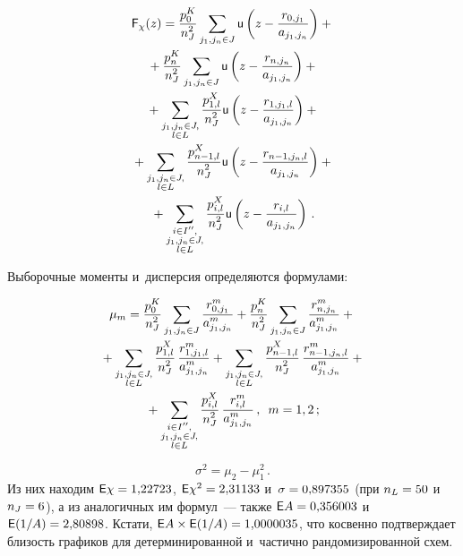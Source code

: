 \begin{multicols}{2}
  \noindent
  \begin{multline*}
  {\sf F}_\chi (z) =\fr{p_0^K}{n_J^2}\sum\limits_{j_1, j_n\in J} {\sf u}\left( z-
\fr{r_{0,j_1}}{a_{j_1,j_n}}\right) +{}\\
{}+\fr{p_n^K}{n_J^2} \sum\limits_{j_1, j_n\in J} 
{\sf u} \left( z- \fr{r_{n,j_n}}{a_{j_1,j_n}}\right) +{}\\
  {}+ \sum\limits_{\substack{{j_1, j_n\in J,}\\
  { l\in L}}} \fr{p^X_{1,l}}{n_J^2}{\sf u} \left( z-
\fr{r_{1,j_1,l}}{a_{j_1,j_n}}\right)+ {}\\
{}+
\sum\limits_{\substack{{j_1, j_n\in J,}\\
{ l\in L}}} \fr{p^X_{n-1, l}}{n_J^2} {\sf u} 
\left( z-\fr{r_{n-1, j_n,l}}{a_{j_1, j_n}}\right)+{}\\
  {}+ \sum\limits_{
  \substack{{i\in I^{\prime\prime},}\\
  {j_1, j_n\in J,}\\
  {l\in L}}} \fr{p^X_{i,l}}{n_J^2} 
{\sf u} \left( z-\fr{r_{i,l}}{a_{j_1,j_n}}\right)\,.
  \end{multline*}
  
  Выборочные моменты и~дисперсия определяются формулами:
  
  \noindent
  \begin{multline*}
  \mu_m=\fr{p_0^K}{n_J^2} \sum\limits_{j_1,j_n\in J} 
\fr{r^m_{0,j_1}}{a^m_{j_1,j_n}}+ \fr{p_n^K}{n_J^2} \sum\limits_{j_1,j_n\in J} 
\fr{r^m_{n,j_n}}{a^m_{j_1,j_n}}+{}\\
{}+\sum\limits_{\substack{{j_1,j_n\in J,}\\ {l\in L} }}
\fr{p^X_{1,l}}{n_J^2}\, \fr{r^m_{1,j_1,l}}{a^m_{j_1, j_n}}+
  \sum\limits_{\substack{{j_1,j_n\in J,}\\
  { l\in L}}} \fr{p^X_{n-1,l}}{n_J^2}\, 
  \fr{r^m_{n-1, j_n, l}}{a^m_{j_1,j_n}} + {}\\
  {}+
  \sum\limits_{\substack{{i\in I^{\prime\prime},}\\
  {j_1,j_n\in J,}\\
  {l\in L}}} 
\fr{p^X_{i,l}}{n_J^2} \,\fr{r^m_{i,l} }{a^m_{j_1, j_n}}\,,\enskip
  m=1,2\,;
    \end{multline*}
    
    \vspace*{-9pt}
    
    \noindent
    $$
  \sigma^2=\mu_2-\mu_1^2\,.
  $$
  Из них находим ${\sf E}\chi = 1{,}22723$, ${\sf E}\chi^2 \hm= 2{,}31133$ 
и~$\sigma\hm = 0{,}897355$ (при $n_L \hm= 50$ и~$n_J \hm= 6$), а из аналогичных 
им формул~--- также ${\sf E}A\hm = 0{,}356003$ и~${\sf E}(1/A) \hm= 
2{,}80898$. Кстати, ${\sf E}A\times {\sf E}(1/A) \hm= 1{,}0000035$, что 
косвенно подтверждает близость графиков для детерминированной и~частично 
рандомизированной схем. 
  

\end{multicols}
